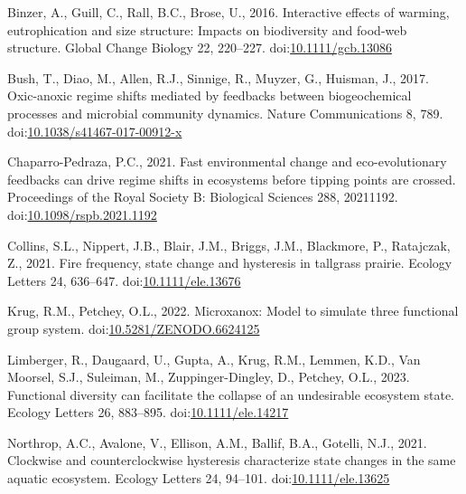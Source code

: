 \documentclass[
]{article}
\newlength{\cslhangindent}
\newlength{\cslentryspacingunit} %
\newenvironment{CSLReferences}[2] %
 {%
  \setlength{\parindent}{0pt}
  \ifodd #1
  \let\oldpar\par
  \def\par{\hangindent=\cslhangindent\oldpar}
  \fi
  \setlength{\parskip}{#2\cslentryspacingunit}
 }%
 {}
\begin{document}
\hypertarget{refs}{}
\begin{CSLReferences}{1}{0}
\leavevmode{}%
Binzer, A., Guill, C., Rall, B.C., Brose, U., 2016. Interactive effects of warming, eutrophication and size structure: Impacts on biodiversity and food-web structure. Global Change Biology 22, 220--227. doi:\href{https://doi.org/10.1111/gcb.13086}{10.1111/gcb.13086}

\leavevmode{}%
Bush, T., Diao, M., Allen, R.J., Sinnige, R., Muyzer, G., Huisman, J., 2017. Oxic-anoxic regime shifts mediated by feedbacks between biogeochemical processes and microbial community dynamics. Nature Communications 8, 789. doi:\href{https://doi.org/10.1038/s41467-017-00912-x}{10.1038/s41467-017-00912-x}

\leavevmode{}%
Chaparro-Pedraza, P.C., 2021. Fast environmental change and eco-evolutionary feedbacks can drive regime shifts in ecosystems before tipping points are crossed. Proceedings of the Royal Society B: Biological Sciences 288, 20211192. doi:\href{https://doi.org/10.1098/rspb.2021.1192}{10.1098/rspb.2021.1192}

\leavevmode{}%
Collins, S.L., Nippert, J.B., Blair, J.M., Briggs, J.M., Blackmore, P., Ratajczak, Z., 2021. Fire frequency, state change and hysteresis in tallgrass prairie. Ecology Letters 24, 636--647. doi:\href{https://doi.org/10.1111/ele.13676}{10.1111/ele.13676}

\leavevmode{}%
Krug, R.M., Petchey, O.L., 2022. Microxanox: {Model} to simulate three functional group system. doi:\href{https://doi.org/10.5281/ZENODO.6624125}{10.5281/ZENODO.6624125}

\leavevmode{}%
Limberger, R., Daugaard, U., Gupta, A., Krug, R.M., Lemmen, K.D., Van Moorsel, S.J., Suleiman, M., Zuppinger-Dingley, D., Petchey, O.L., 2023. Functional diversity can facilitate the collapse of an undesirable ecosystem state. Ecology Letters 26, 883--895. doi:\href{https://doi.org/10.1111/ele.14217}{10.1111/ele.14217}

\leavevmode{}%
Northrop, A.C., Avalone, V., Ellison, A.M., Ballif, B.A., Gotelli, N.J., 2021. Clockwise and counterclockwise hysteresis characterize state changes in the same aquatic ecosystem. Ecology Letters 24, 94--101. doi:\href{https://doi.org/10.1111/ele.13625}{10.1111/ele.13625}


\end{CSLReferences}
\end{document}
